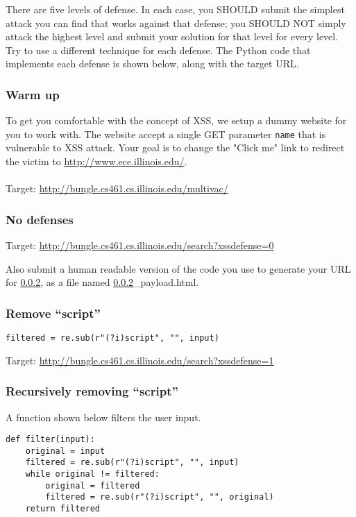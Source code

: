 \documentclass[letterpaper,12pt]{report}
\newcommand{\bungledomain}{http://bungle.cs461.cs.illinois.edu}
\begin{document}
There are five levels of defense.  In each case, you SHOULD submit the simplest attack you can find that works against that defense; you SHOULD NOT simply attack the highest level and submit your solution for that level for every level. Try to use a different technique for each defense.  The Python code that implements each defense is shown below, along with the target URL.

\subsubsection{Warm up}
\label{sec:xss_warm_up}
To get you comfortable with the concept of XSS, we setup a dummy website for you to work with.  The website accept a single GET parameter \texttt{name} that is vulnerable to XSS attack.  Your goal is to change the "Click me" link to redirect the victim to \url{http://www.ece.illinois.edu/}.\\\\
Target: \url{\bungledomain/multivac/}

\subsubsection{No defenses}
\label{sec:xss_1}
Target: \url{\bungledomain/search?xssdefense=0}\\
\smallskip

Also submit a human readable version of the code you use to generate your URL for \ref{sec:xss_1}, as a file named \ref{sec:xss_1}\_payload.html.

\subsubsection{\textbf{Remove ``script''}}
\label{sec:xss_2}
\verb+filtered = re.sub(r"(?i)script", "", input)+
\smallskip

Target: \url{\bungledomain/search?xssdefense=1}\\

\subsubsection{\textbf{Recursively removing ``script''}}
\label{sec:xss_3}
A function shown below filters the user input.

\begin{mdframed}
\begin{Verbatim}
def filter(input):
    original = input
    filtered = re.sub(r"(?i)script", "", input)
    while original != filtered:
        original = filtered
        filtered = re.sub(r"(?i)script", "", original)
    return filtered
\end{Verbatim}
\end{mdframed}
\smallskip
\end{document}
